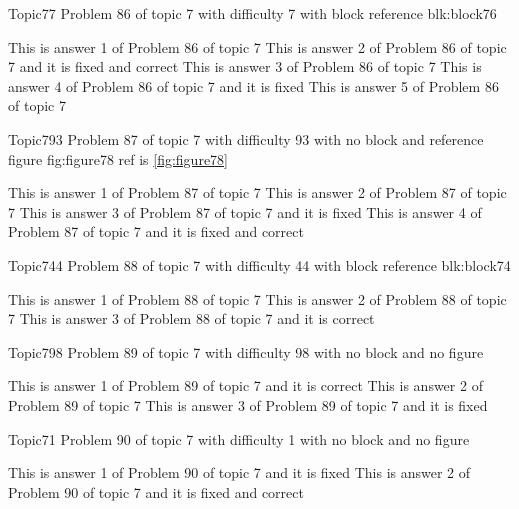 \documentclass[master]{exam}
\begin{document}
\begin{problem}[requires=blk:block76]{Topic7}{7}
	Problem 86 of topic 7 with difficulty 7 with block reference blk:block76
	\begin{answers}
		\answer This is answer 1 of Problem 86 of topic 7 
		 This is answer 2 of Problem 86 of topic 7 and it is fixed and correct
		\answer This is answer 3 of Problem 86 of topic 7 
		\answer[fixed] This is answer 4 of Problem 86 of topic 7 and it is fixed
		\answer This is answer 5 of Problem 86 of topic 7 
	\end{answers}
\end{problem}

\begin{problem}{Topic7}{93}
	Problem 87 of topic 7 with difficulty 93 with no block and reference figure fig:figure78 ref is \ref{fig:figure78}
	\begin{answers}
		\answer This is answer 1 of Problem 87 of topic 7 
		\answer This is answer 2 of Problem 87 of topic 7 
		\answer[fixed] This is answer 3 of Problem 87 of topic 7 and it is fixed
		 This is answer 4 of Problem 87 of topic 7 and it is fixed and correct
	\end{answers}
\end{problem}

\begin{problem}[requires=blk:block74]{Topic7}{44}
	Problem 88 of topic 7 with difficulty 44 with block reference blk:block74
	\begin{answers}
		\answer This is answer 1 of Problem 88 of topic 7 
		\answer This is answer 2 of Problem 88 of topic 7 
		\answer[correct] This is answer 3 of Problem 88 of topic 7 and it is correct
	\end{answers}
\end{problem}

\begin{problem}{Topic7}{98}
	Problem 89 of topic 7 with difficulty 98 with no block and no figure
	\begin{answers}
		\answer[correct] This is answer 1 of Problem 89 of topic 7 and it is correct
		\answer This is answer 2 of Problem 89 of topic 7 
		\answer[fixed] This is answer 3 of Problem 89 of topic 7 and it is fixed
	\end{answers}
\end{problem}

\begin{problem}{Topic7}{1}
	Problem 90 of topic 7 with difficulty 1 with no block and no figure
	\begin{answers}
		\answer[fixed] This is answer 1 of Problem 90 of topic 7 and it is fixed
		 This is answer 2 of Problem 90 of topic 7 and it is fixed and correct
	\end{answers}
\end{problem}
\end{document}
